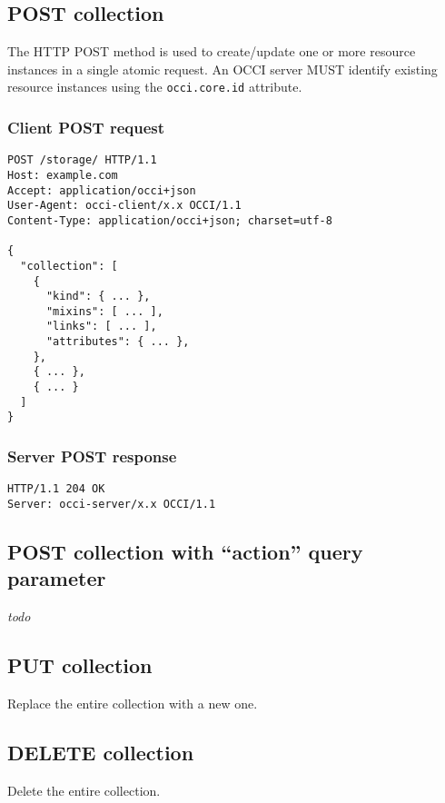 \documentclass[10pt,a4paper]{article}
\begin{document}
\subsection{POST collection}
The HTTP POST method is used to create/update one or more resource instances in
a single atomic request. An OCCI server MUST identify existing resource instances
using the {\tt occi.core.id} attribute.

\subsubsection{Client POST request}
\begin{verbatim}
POST /storage/ HTTP/1.1
Host: example.com
Accept: application/occi+json
User-Agent: occi-client/x.x OCCI/1.1
Content-Type: application/occi+json; charset=utf-8

{
  "collection": [
    {
      "kind": { ... },
      "mixins": [ ... ],
      "links": [ ... ],
      "attributes": { ... },
    },
    { ... },
    { ... }
  ]
}
\end{verbatim}

\subsubsection{Server POST response}
\begin{verbatim}
HTTP/1.1 204 OK
Server: occi-server/x.x OCCI/1.1
\end{verbatim}

\subsection{POST collection with ``action'' query parameter}
{\em todo}

\subsection{PUT collection}
Replace the entire collection with a new one. 

\subsection{DELETE collection}
Delete the entire collection. 
\end{document}
